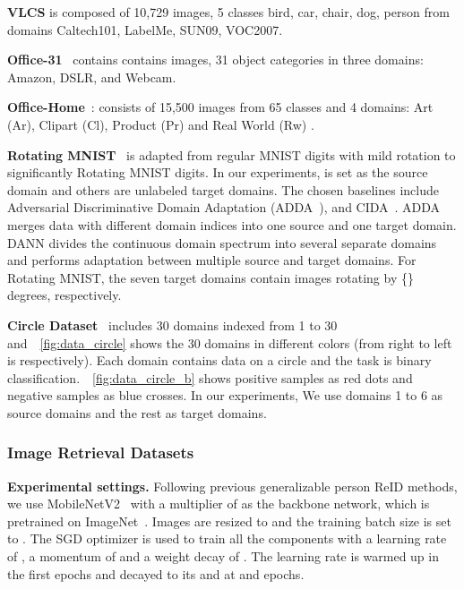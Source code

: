 \documentclass{article} \usepackage{iclr2023_conference,times}
\begin{document}
\noindent\textbf{VLCS} \citep{torralba2011unbiased} is composed of 10,729 images, 5 classes  bird, car, chair, dog, person  from domains Caltech101, LabelMe, SUN09, VOC2007. 

\noindent\textbf{Office-31}~\citep{saenko2010adapting} contains contains  images, 31 object categories in three domains:  Amazon, DSLR, and Webcam.


\textbf{Office-Home}~\citep{venkateswara2017deep}: consists of 15,500 images from 65 classes and 4 domains:  Art (Ar), Clipart (Cl), Product (Pr) and Real World (Rw) .

\noindent\textbf{Rotating MNIST}~\citep{wang2020continuously} is adapted from regular MNIST digits with mild rotation to significantly Rotating MNIST digits. In our experiments,  is set as the source domain and others are unlabeled target domains. The chosen baselines include Adversarial Discriminative Domain Adaptation (ADDA~\citep{tzeng2017adversarial}), and CIDA~\citep{wang2020continuously}. ADDA merges data with different domain indices into one source and one target domain. DANN divides the continuous domain spectrum into several separate domains and performs adaptation between multiple source and target domains. For Rotating MNIST, the seven target domains contain images rotating by \{\} degrees, respectively.

\noindent\textbf{Circle Dataset}~\citep{wang2020continuously} includes 30 domains indexed from 1 to 30 and~\figurename~\ref{fig:data_circle} shows the 30 domains in different colors (from right to left is  respectively).  Each domain contains data on a circle and the task is binary classification.~\figurename~\ref{fig:data_circle_b} shows positive samples as red dots and negative samples as blue crosses. In our experiments, We use domains 1 to 6 as source domains and the rest as target domains.

\subsubsection{Image Retrieval Datasets}

\textbf{Experimental settings.}
Following previous generalizable person ReID methods, we use MobileNetV2~\citep{sandler2018mobilenetv2} with a multiplier of  as the backbone network, which is pretrained on ImageNet~\citep{deng2009imagenet}. Images are resized to  and the training batch size  is set to . The SGD optimizer is used to train all the components  with a learning rate of , a momentum of  and a weight decay of . The learning rate is warmed up in the first  epochs and decayed to its  and  at  and  epochs.
\end{document}
